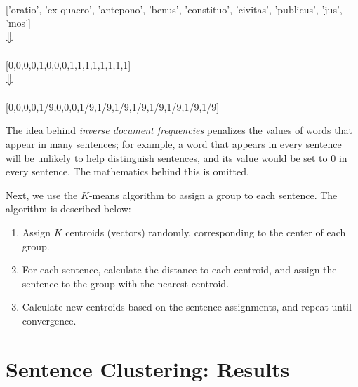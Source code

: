 \documentclass[a4paper, 12pt,notitlepage]{article} %
\newenvironment{tightcenter}{%
	\setlength\topsep{2pt}
	\setlength\parskip{2pt}
	\singlespacing %
	\begin{center}
	}{%
	\end{center}
}
\numberwithin{dummy}{subsection}
\numberwithin{dummy}{section}
\theoremstyle{named}
\theoremstyle{definition}
\theoremstyle{definition}
\begin{document}
\begin{tightcenter}
	{\small {}}\\{\ttfamily \small ['oratio', 'ex-quaero', 'antepono', 'benus', 'constituo', 'civitas', 'publicus', 'jus', 'mos']} \cite[I.2]{drp}\\
	\vspace{3pt}
	$\big \Downarrow$
	\vspace{3pt}\\
	{\small \ttfamily [1,1,1,2,1,1,1,1,0,0,0,0,0,0,0,0]}\\{\ttfamily \small [0,0,0,0,1,0,0,0,1,1,1,1,1,1,1,1]}\\
	\vspace{3pt}
	$\big \Downarrow$
	\vspace{3pt}\\
	{\small \ttfamily [1/9,1/9,1/9,2/9,1/9,1/9,1/9,1/9,0,0,0,0,0,0,0,0]}\\{\ttfamily \small
		[0,0,0,0,1/9,0,0,0,1/9,1/9,1/9,1/9,1/9,1/9,1/9,1/9]
	}
	
\end{tightcenter}

\noindent The idea behind \textit{inverse document frequencies} penalizes the values of words that appear in many sentences; for example, a word that appears in every sentence will be unlikely to help distinguish sentences, and its value would be set to $0$ in every sentence. The mathematics behind this is omitted.

Next, we use the $K$-means algorithm to assign a group to each sentence. The algorithm is described below:

\begin{enumerate}
	\itemsep 0em
	\item Assign $K$ centroids (vectors) randomly, corresponding to the center of each group.
	\item For each sentence, calculate the distance to each centroid, and assign the sentence to the group with the nearest centroid.
	\item Calculate new centroids based on the sentence assignments, and repeat until convergence.
\end{enumerate}

\section{Sentence Clustering: Results}
\end{document}
